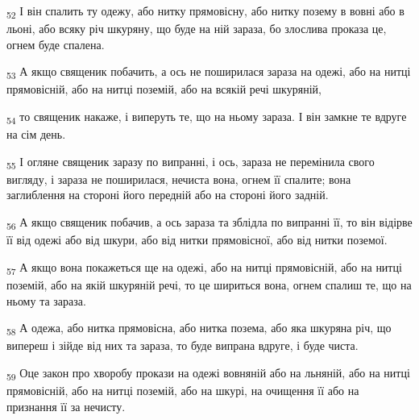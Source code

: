 \begin{tcolorbox}
\textsubscript{52} І він спалить ту одежу, або нитку прямовісну, або нитку позему в вовні або в льоні, або всяку річ шкуряну, що буде на ній зараза, бо злослива проказа це, огнем буде спалена.
\end{tcolorbox}
\begin{tcolorbox}
\textsubscript{53} А якщо священик побачить, а ось не поширилася зараза на одежі, або на нитці прямовісній, або на нитці поземій, або на всякій речі шкуряній,
\end{tcolorbox}
\begin{tcolorbox}
\textsubscript{54} то священик накаже, і виперуть те, що на ньому зараза. І він замкне те вдруге на сім день.
\end{tcolorbox}
\begin{tcolorbox}
\textsubscript{55} І огляне священик заразу по випранні, і ось, зараза не перемінила свого вигляду, і зараза не поширилася, нечиста вона, огнем її спалите; вона заглиблення на стороні його передній або на стороні його задній.
\end{tcolorbox}
\begin{tcolorbox}
\textsubscript{56} А якщо священик побачив, а ось зараза та зблідла по випранні її, то він відірве її від одежі або від шкури, або від нитки прямовісної, або від нитки поземої.
\end{tcolorbox}
\begin{tcolorbox}
\textsubscript{57} А якщо вона покажеться ще на одежі, або на нитці прямовісній, або на нитці поземій, або на якій шкуряній речі, то це шириться вона, огнем спалиш те, що на ньому та зараза.
\end{tcolorbox}
\begin{tcolorbox}
\textsubscript{58} А одежа, або нитка прямовісна, або нитка позема, або яка шкуряна річ, що випереш і зійде від них та зараза, то буде випрана вдруге, і буде чиста.
\end{tcolorbox}
\begin{tcolorbox}
\textsubscript{59} Оце закон про хворобу прокази на одежі вовняній або на льняній, або на нитці прямовісній, або на нитці поземій, або на шкурі, на очищення її або на признання її за нечисту.
\end{tcolorbox}
